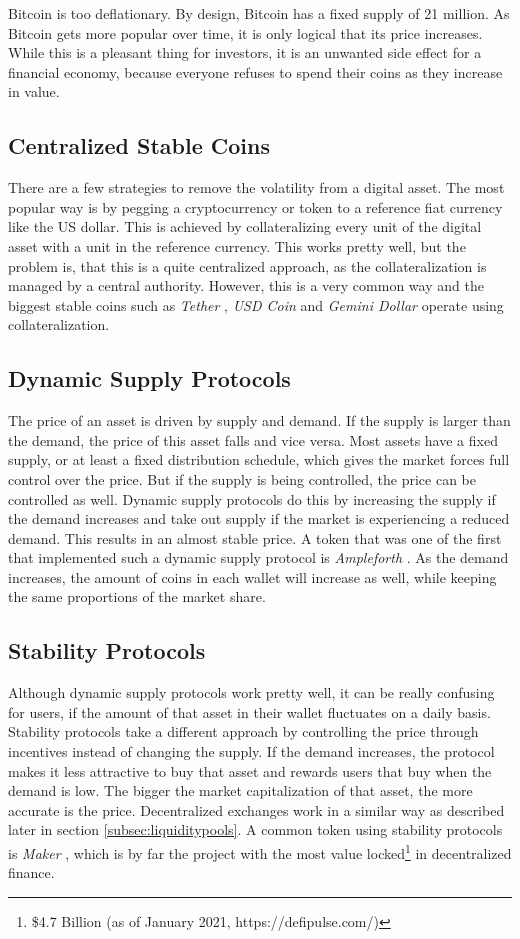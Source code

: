 Bitcoin is too deflationary. By design, Bitcoin has a fixed supply of 21 million. As Bitcoin gets more popular over time, it is only logical that its price increases. While this is a pleasant thing for investors, it is an unwanted side effect for a financial economy, because everyone refuses to spend their coins as they increase in value.
\subsection{Centralized Stable Coins}
There are a few strategies to remove the volatility from a digital asset. The most popular way is by pegging a cryptocurrency or token to a reference fiat currency like the US dollar. This is achieved by collateralizing every unit of the digital asset with a unit in the reference currency. This works pretty well, but the problem is, that this is a quite centralized approach, as the collateralization is managed by a central authority. However, this is a very common way and the biggest stable coins such as \textit{Tether} \cite{Tether2021}, \textit{USD Coin} \cite{USDCoin2021} and \textit{Gemini Dollar} \cite{GeminiDollar2021} operate using collateralization.

\subsection{Dynamic Supply Protocols}
The price of an asset is driven by supply and demand. If the supply is larger than the demand, the price of this asset falls and vice versa. Most assets have a fixed supply, or at least a fixed distribution schedule, which gives the market forces full control over the price. But if the supply is being controlled, the price can be controlled as well. Dynamic supply protocols do this by increasing the supply if the demand increases and take out supply if the market is experiencing a reduced demand. This results in an almost stable price. A token that was one of the first that implemented such a dynamic supply protocol is \textit{Ampleforth} \cite{Ampleforth}. As the demand increases, the amount of coins in each wallet will increase as well, while keeping the same proportions of the market share.

\subsection{Stability Protocols}
Although dynamic supply protocols work pretty well, it can be really confusing for users, if the amount of that asset in their wallet fluctuates on a daily basis. Stability protocols take a different approach by controlling the price through incentives instead of changing the supply. If the demand increases, the protocol makes it less attractive to buy that asset and rewards users that buy when the demand is low. The bigger the market capitalization of that asset, the more accurate is the price. Decentralized exchanges work in a similar way as described later in section \ref{subsec:liquiditypools}. A common token using stability protocols is \textit{Maker} \cite{MakerDAO2021}, which is by far the project with the most value locked\footnote{\$4.7 Billion (as of January 2021, https://defipulse.com/)} in decentralized finance.

